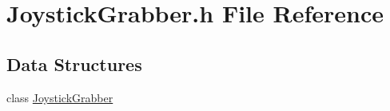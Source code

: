 \hypertarget{a00022}{\section{Joystick\-Grabber.\-h File Reference}
\label{a00022}
}
\subsection*{Data Structures}
\begin{DoxyCompactItemize}
\item 
class \hyperlink{a00005}{Joystick\-Grabber}
\end{DoxyCompactItemize}
